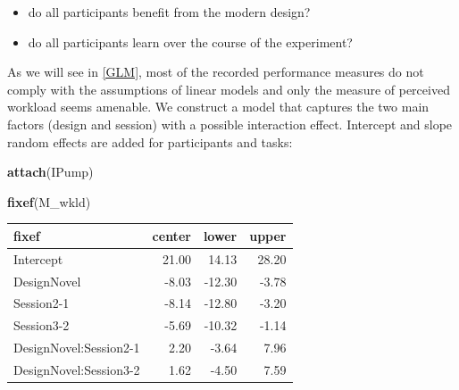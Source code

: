 \documentclass[]{svmono}
\newenvironment{Shaded}{\begin{snugshade}}{\end{snugshade}}
\newcommand{\KeywordTok}[1]{\textcolor[rgb]{0.13,0.29,0.53}{\textbf{#1}}}
\newcommand{\DataTypeTok}[1]{\textcolor[rgb]{0.13,0.29,0.53}{#1}}
\newcommand{\StringTok}[1]{\textcolor[rgb]{0.31,0.60,0.02}{#1}}
\newcommand{\OperatorTok}[1]{\textcolor[rgb]{0.81,0.36,0.00}{\textbf{#1}}}
\newcommand{\NormalTok}[1]{#1}
\providecommand{\tightlist}{%
  \setlength{\itemsep}{0pt}\setlength{\parskip}{0pt}}
\begin{document}
\begin{itemize}
\tightlist
\item
  do all participants benefit from the modern design?
\item
  do all participants learn over the course of the experiment?
\end{itemize}

As we will see in \ref{GLM}, most of the recorded performance measures
do not comply with the assumptions of linear models and only the measure
of perceived workload seems amenable. We construct a model that captures
the two main factors (design and session) with a possible interaction
effect. Intercept and slope random effects are added for participants
and tasks:

\begin{Shaded}
\begin{Highlighting}[]
\KeywordTok{attach}\NormalTok{(IPump)}
\end{Highlighting}
\end{Shaded}

\begin{Shaded}
\end{Shaded}

\begin{Shaded}
\begin{Highlighting}[]
\KeywordTok{fixef}\NormalTok{(M_wkld)}
\end{Highlighting}
\end{Shaded}

\begin{longtable}[]{@{}lrrr@{}}
\toprule
fixef & center & lower & upper\tabularnewline
\midrule
\endhead
Intercept & 21.00 & 14.13 & 28.20\tabularnewline
DesignNovel & -8.03 & -12.30 & -3.78\tabularnewline
Session2-1 & -8.14 & -12.80 & -3.20\tabularnewline
Session3-2 & -5.69 & -10.32 & -1.14\tabularnewline
DesignNovel:Session2-1 & 2.20 & -3.64 & 7.96\tabularnewline
DesignNovel:Session3-2 & 1.62 & -4.50 & 7.59\tabularnewline
\bottomrule
\end{longtable}
\end{document}
